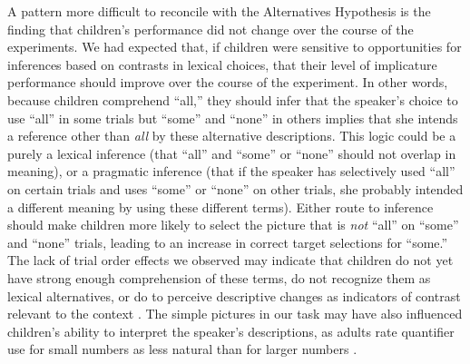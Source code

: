 \documentclass[10pt,letterpaper]{article}
\begin{document}
A pattern more difficult to reconcile with the Alternatives Hypothesis is the finding that children's performance did not change over the course of the experiments. We had expected that, if children were sensitive to opportunities for inferences based on contrasts in lexical choices, that their level of implicature performance should improve over the course of the experiment. In other words, because children comprehend ``all,'' they should infer that the speaker's choice to use ``all'' in some trials but ``some'' and ``none'' in others implies that she intends a reference other than \emph{all} by these alternative descriptions. This logic could be a purely a lexical inference (that ``all'' and ``some'' or ``none'' should not overlap in meaning), or a pragmatic inference (that if the speaker has selectively used ``all'' on certain trials and uses ``some'' or ``none'' on other trials, she probably intended a different meaning by using these different terms). Either route to inference should make children more likely to select the picture that is \emph{not} ``all'' on ``some'' and ``none'' trials, leading to an increase in correct target selections for ``some.'' The lack of trial order effects we observed may indicate that children do not yet have strong enough comprehension of these terms, do not recognize them as lexical alternatives, or do to perceive descriptive changes as indicators of contrast relevant to the context \citep{skordos2014}. The simple pictures in our task may have also influenced children's ability to interpret the speaker's descriptions, as adults rate quantifier use for small numbers as less natural than for larger numbers \citep{degen2014b}. 




\end{document}
